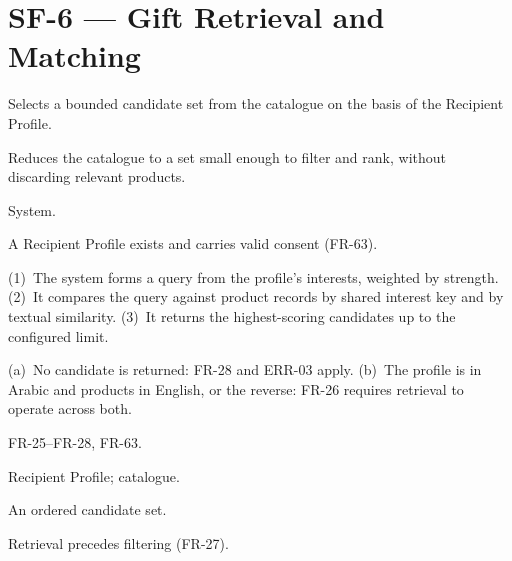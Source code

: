 \documentclass[11pt,a4paper]{report}
\begin{document}
\section{SF-6 --- Gift Retrieval and Matching}
\begin{description}[style=nextline,leftmargin=0pt]
\item[Description] Selects a bounded candidate set from the catalogue on the basis of the Recipient Profile.
\item[Purpose] Reduces the catalogue to a set small enough to filter and rank, without discarding relevant products.
\item[Actors] System.
\item[Preconditions] A Recipient Profile exists and carries valid consent (FR-63).
\item[Main flow] (1)~The system forms a query from the profile's interests, weighted by strength. (2)~It compares the query against product records by shared interest key and by textual similarity. (3)~It returns the highest-scoring candidates up to the configured limit.
\item[Alternative and exception flows] (a)~No candidate is returned: FR-28 and ERR-03 apply. (b)~The profile is in Arabic and products in English, or the reverse: FR-26 requires retrieval to operate across both.
\item[Requirements] FR-25--FR-28, FR-63.
\item[Inputs] Recipient Profile; catalogue.
\item[Outputs] An ordered candidate set.
\item[Constraints] Retrieval precedes filtering (FR-27).
\end{description}
\end{document}
